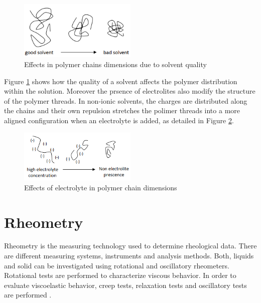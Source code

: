 \begin{figure}[th]
\centering
\includegraphics[width=0.50\textwidth]{./Figures/goodbadsolvent.png}
\decoRule
\caption[Effects in polymer chains dimensions due to solvent quality]{Effects in polymer chains dimensions due to solvent quality \cite{Flores2017}}
\label{fig:goodbadsolvent}
\end{figure}

Figure \ref{fig:goodbadsolvent} shows how the quality of a solvent affects the polymer distribution within the solution. Moreover the prsence of electrolites also modify the structure of the polymer threads. In non-ionic solvents, the charges are distributed along the chains and their own repulsion stretches the polimer threads into a more aligned configuration when an electrolyte is added, as detailed in Figure \ref{fig:electrolyteConcentration}.

\begin{figure}[th]
\centering
\includegraphics[width=0.50\textwidth]{./Figures/electrolyteConcentration.png}
\decoRule
\caption[Effects of electrolyte in polymer chain dimensions]{Effects of electrolyte in polymer chain dimensions \cite{Flores2017}}
\label{fig:electrolyteConcentration}
\end{figure}

\section{Rheometry}
Rheometry is the measuring technology used to determine rheological data. There are different measuring systems, instruments and analysis methods. Both, liquids and solid  can be investigated using rotational and oscillatory rheometers. Rotational tests are performed to characterize viscous behavior. In order to evaluate viscoelastic behavior, creep tests, relaxation tests and oscillatory tests are performed \cite{Flores2017}.

